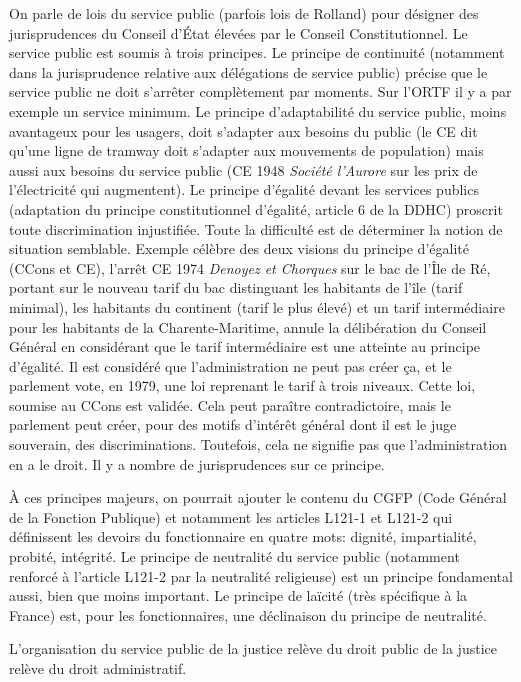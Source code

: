 \documentclass[math]{cours}
\begin{document}
On parle de lois du service public (parfois lois de Rolland) pour désigner des jurisprudences du Conseil d'État élevées par le Conseil Constitutionnel.
Le service public est soumis à trois principes.
Le principe de continuité (notamment dans la jurisprudence relative aux délégations de service public) précise que le service public ne doit s'arrêter complètement par moments.
Sur l'ORTF il y a par exemple un service minimum.
Le principe d'adaptabilité du service public, moins avantageux pour les usagers, doit s'adapter aux besoins du public (le CE dit qu'une ligne de tramway doit s'adapter aux mouvements de population) mais aussi aux besoins du service public (CE 1948 \emph{Société l'Aurore} sur les prix de l'électricité qui augmentent).
Le principe d'égalité devant les services publics (adaptation du principe constitutionnel d'égalité, article 6 de la DDHC) proscrit toute discrimination injustifiée.
Toute la difficulté est de déterminer la notion de situation semblable.
Exemple célèbre des deux visions du principe d'égalité (CCons et CE), l'arrêt CE 1974 \emph{Denoyez et Chorques} sur le bac de l'Île de Ré, portant sur le nouveau tarif du bac distinguant les habitants de l'île (tarif minimal), les habitants du continent (tarif le plus élevé) et un tarif intermédiaire pour les habitants de la Charente-Maritime, annule la délibération du Conseil Général en considérant que le tarif intermédiaire est une atteinte au principe d'égalité.
Il est considéré que l'administration ne peut pas créer ça, et le parlement vote, en 1979, une loi reprenant le tarif à trois niveaux.
Cette loi, soumise au CCons est validée.
Cela peut paraître contradictoire, mais le parlement peut créer, pour des motifs d'intérêt général dont il est le juge souverain, des discriminations.
Toutefois, cela ne signifie pas que l'administration en a le droit.
Il y a nombre de jurisprudences sur ce principe.

À ces principes majeurs, on pourrait ajouter le contenu du CGFP (Code Général de la Fonction Publique) et notamment les articles L121-1 et L121-2 qui définissent les devoirs du fonctionnaire en quatre mots: dignité, impartialité, probité, intégrité.
Le principe de neutralité du service public (notamment renforcé à l'article L121-2 par la neutralité religieuse) est un principe fondamental aussi, bien que moins important.
Le principe de laïcité (très spécifique à la France) est, pour les fonctionnaires, une déclinaison du principe de neutralité.

L'organisation du service public de la justice relève du droit public de la justice relève du droit administratif.
\end{document}
